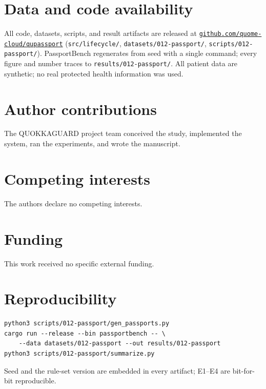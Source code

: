 \documentclass[11pt]{article}
\begin{document}
\section*{Data and code availability}
All code, datasets, scripts, and result artifacts are released at
\href{https://github.com/quome-cloud/qupassport}{\nolinkurl{github.com/quome-cloud/qupassport}}
(\texttt{src/lifecycle/}, \texttt{datasets/012-passport/}, \texttt{scripts/012-passport/}).
PassportBench regenerates from seed \Seed{} with a single command; every figure and
number traces to \texttt{results/012-passport/}. All patient data are synthetic; no
real protected health information was used.

\section*{Author contributions}
The QUOKKAGUARD project team conceived the study, implemented the system, ran the
experiments, and wrote the manuscript.

\section*{Competing interests}
The authors declare no competing interests.

\section*{Funding}
This work received no specific external funding.

\appendix
\section{Reproducibility}\label{app:repro}
\begin{lstlisting}[style=housespecyamlbare]
python3 scripts/012-passport/gen_passports.py
cargo run --release --bin passportbench -- \
    --data datasets/012-passport --out results/012-passport
python3 scripts/012-passport/summarize.py
\end{lstlisting}
Seed \Seed{} and the rule-set version \Ruleset{} are embedded in every artifact;
E1--E4 are bit-for-bit reproducible.

\clearpage


\end{document}
